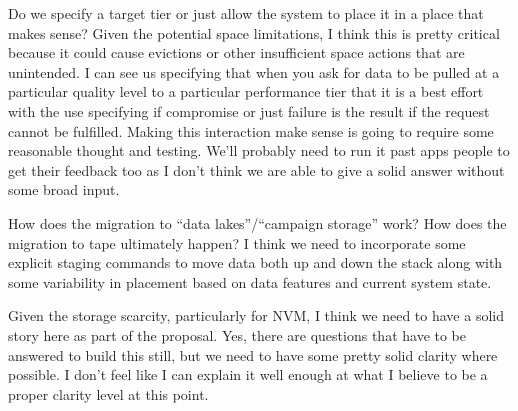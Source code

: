 Do we specify a target tier or just allow the system to place it in a place
that makes sense? Given the potential space limitations, I think this is pretty
critical because it could cause evictions or other insufficient space actions
that are unintended. I can see us specifying that when you ask for data to be
pulled at a particular quality level to a particular performance tier that it
is a best effort with the use specifying if compromise or just failure is the
result if the request cannot be fulfilled.  Making this interaction make sense
is going to require some reasonable thought and testing. We'll probably need to
run it past apps people to get their feedback too as I don't think we are able
to give a solid answer without some broad input.

How does the migration to ``data lakes''/``campaign storage'' work? How does the
migration to tape ultimately happen? I think we need to incorporate some
explicit staging commands to move data both up and down the stack along with
some variability in placement based on data features and current system state. 

Given the storage scarcity, particularly for NVM, I think we need to have a
solid story here as part of the proposal. Yes, there are questions that have to
be answered to build this still, but we need to have some pretty solid clarity
where possible. I don't feel like I can explain it well enough at what I
believe to be a proper clarity level at this point.

